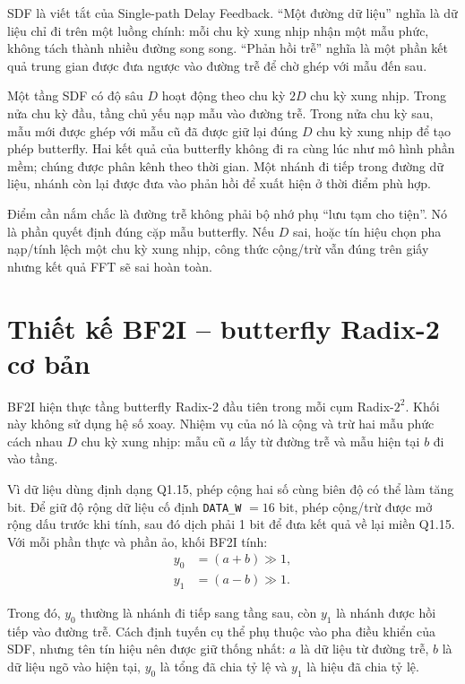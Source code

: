 \documentclass[12pt,a4paper]{report}
\numberwithin{equation}{chapter}
\begin{document}
SDF là viết tắt của Single-path Delay Feedback. ``Một đường dữ liệu'' nghĩa là dữ liệu chỉ đi trên một luồng chính: mỗi chu kỳ xung nhịp nhận một mẫu phức, không tách thành nhiều đường song song. ``Phản hồi trễ'' nghĩa là một phần kết quả trung gian được đưa ngược vào đường trễ để chờ ghép với mẫu đến sau.

Một tầng SDF có độ sâu $D$ hoạt động theo chu kỳ $2D$ chu kỳ xung nhịp. Trong nửa chu kỳ đầu, tầng chủ yếu nạp mẫu vào đường trễ. Trong nửa chu kỳ sau, mẫu mới được ghép với mẫu cũ đã được giữ lại đúng $D$ chu kỳ xung nhịp để tạo phép butterfly. Hai kết quả của butterfly không đi ra cùng lúc như mô hình phần mềm; chúng được phân kênh theo thời gian. Một nhánh đi tiếp trong đường dữ liệu, nhánh còn lại được đưa vào phản hồi để xuất hiện ở thời điểm phù hợp.

Điểm cần nắm chắc là đường trễ không phải bộ nhớ phụ ``lưu tạm cho tiện''. Nó là phần quyết định đúng cặp mẫu butterfly. Nếu $D$ sai, hoặc tín hiệu chọn pha nạp/tính lệch một chu kỳ xung nhịp, công thức cộng/trừ vẫn đúng trên giấy nhưng kết quả FFT sẽ sai hoàn toàn.

\section{Thiết kế BF2I -- butterfly Radix-2 cơ bản}
\label{sec:r22rtl_bf2i}

BF2I hiện thực tầng butterfly Radix-2 đầu tiên trong mỗi cụm Radix-$2^2$. Khối này không sử dụng hệ số xoay. Nhiệm vụ của nó là cộng và trừ hai mẫu phức cách nhau $D$ chu kỳ xung nhịp: mẫu cũ $a$ lấy từ đường trễ và mẫu hiện tại $b$ đi vào tầng.

Vì dữ liệu dùng định dạng Q1.15, phép cộng hai số cùng biên độ có thể làm tăng bit. Để giữ độ rộng dữ liệu cố định \texttt{DATA\_W} $=16$ bit, phép cộng/trừ được mở rộng dấu trước khi tính, sau đó dịch phải 1 bit để đưa kết quả về lại miền Q1.15. Với mỗi phần thực và phần ảo, khối BF2I tính:
\begin{align}
    y_0 &= (a+b) \gg 1, \label{eq:r22rtl_bf2i_sum}\\
    y_1 &= (a-b) \gg 1. \label{eq:r22rtl_bf2i_diff}
\end{align}

Trong đó, $y_0$ thường là nhánh đi tiếp sang tầng sau, còn $y_1$ là nhánh được hồi tiếp vào đường trễ. Cách định tuyến cụ thể phụ thuộc vào pha điều khiển của SDF, nhưng tên tín hiệu nên được giữ thống nhất: $a$ là dữ liệu từ đường trễ, $b$ là dữ liệu ngõ vào hiện tại, $y_0$ là tổng đã chia tỷ lệ và $y_1$ là hiệu đã chia tỷ lệ.
\end{document}
